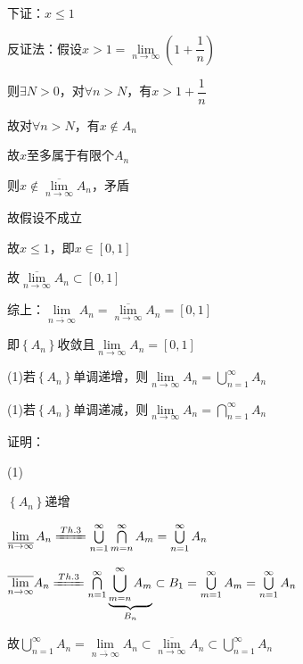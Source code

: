 \par 下证：$x \leqslant 1$
\par 反证法：假设$x >1 = \lim \limits_{n \to \infty} \left(1 + \dfrac{1}{n}\right)$
\par \quad \quad \quad \quad 则$\exists N > 0$，对$\forall n > N$，有$x > 1 + \dfrac{1}{n}$
\par \quad \quad \quad \quad 故对$\forall n > N$，有$x \notin A_{n}$
\par \quad \quad \quad \quad 故$x$至多属于有限个$A_{n}$
\par \quad \quad \quad \quad 则$x \notin \overline{\lim \limits_{n \to \infty}}A_{n}$，矛盾
\par \quad \quad \quad \quad 故假设不成立
\par \quad \quad \quad \quad 故$x \leqslant 1$，即$x \in \left[0,1\right] $
\par \quad \quad \quad \quad 故$\overline{\lim \limits_{n \to \infty}}A_{n} \subset \left[0,1\right]$
\par 综上：$\lim \limits_{\overline{n \to \infty}}A_{n} = \overline{\lim \limits_{n \to \infty}}A_{n} = \left[0,1\right]$
\par \quad \quad \quad 即$\left\{A_{n}\right\}$收敛且$\lim \limits_{n \to \infty} A_{n} = \left[0,1\right] $
\newpage
\begin{wa}
\par (1)若$\left\{A_{n}\right\}$单调递增，则$\lim \limits_{n \to \infty} A_{n} = \bigcup \limits_{n=1}^{\infty}A_{n}$
\par (1)若$\left\{A_{n}\right\}$单调递减，则$\lim \limits_{n \to \infty} A_{n} = \bigcap \limits_{n=1}^{\infty}A_{n}$
\end{wa}
\noindent 证明：
\par (1)
\par $\left\{A_{n}\right\}$递增
\par $\lim \limits_{\overline{n \to \infty}}A_{n} \xlongequal{Th.3}\bigcup \limits_{n=1}^{\infty}\bigcap \limits_{m=n}^{\infty}A_{m} = \bigcup \limits_{n=1}^{\infty}A_{n}$
\par $\overline{\lim \limits_{n \to \infty}}A_{n} \xlongequal{Th.3}\bigcap \limits_{n=1}^{\infty}\underbrace{\bigcup \limits_{m=n}^{\infty}A_{m}}_\text{$B_{n}$} \subset B_{1} = \bigcup \limits_{m=1}^{\infty}A_{m} = \bigcup \limits_{n=1}^{\infty}A_{n}$
\par 故$\bigcup \limits_{n=1}^{\infty}A_{n} = \lim \limits_{\overline{n \to \infty}}A_{n} \subset \overline{\lim \limits_{n \to \infty}}A_{n} \subset \bigcup \limits_{n=1}^{\infty}A_{n}$
